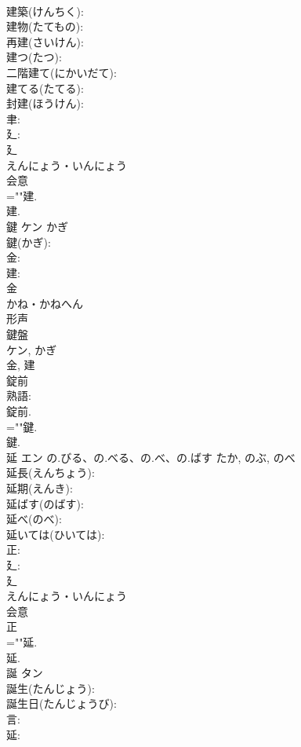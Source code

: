 \documentclass[8pt]{extreport}
\begin{document}
\begin{CJK}{UTF8}{min}
\\	建築(けんちく): 
\\	建物(たてもの): 
\\	再建(さいけん): 
\\	建つ(たつ): 
\\	二階建て(にかいだて): 
\\	建てる(たてる): 
\\	封建(ほうけん): 
\\	聿: 
\\	廴: 
\\	廴	
\\	えんにょう・いんにょう	
\\	会意 
\\	=""建.
\\	建.
\\	鍵	ケン	かぎ		
\\	鍵(かぎ): 
\\	金: 
\\	建: 
\\	金	
\\	かね・かねへん	
\\	形声 
\\	鍵盤
\\	ケン, かぎ 
\\	金, 建 
\\	錠前 
\\	熟語: 
\\	錠前.	
\\	=""鍵.
\\	鍵.
\\	延	エン	の.びる、の.べる、の.べ、の.ばす	たか, のぶ, のべ	
\\	延長(えんちょう): 
\\	延期(えんき): 
\\	延ばす(のばす): 
\\	延べ(のべ): 
\\	延いては(ひいては): 
\\	正: 
\\	廴: 
\\	廴	
\\	えんにょう・いんにょう	
\\	会意 
\\	正 
\\	=""延.
\\	延.
\\	誕	タン			
\\	誕生(たんじょう): 
\\	誕生日(たんじょうび): 
\\	言: 
\\	延: 

\end{CJK}
\end{document}
